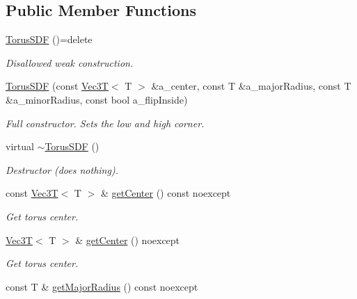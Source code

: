 \subsection*{Public Member Functions}
\begin{DoxyCompactItemize}
\item 
\mbox{\label{classTorusSDF_a4591d7c3cdbbed45fdbaf414f0d096ee}} 
\hyperlink{classTorusSDF_a4591d7c3cdbbed45fdbaf414f0d096ee}{Torus\+S\+DF} ()=delete
\begin{DoxyCompactList}\small\item\em Disallowed weak construction. \end{DoxyCompactList}\item 
\hyperlink{classTorusSDF_acf22c1b59605e93750a3a002fd5bc23a}{Torus\+S\+DF} (const \hyperlink{classVec3T}{Vec3T}$<$ T $>$ \&a\+\_\+center, const T \&a\+\_\+major\+Radius, const T \&a\+\_\+minor\+Radius, const bool a\+\_\+flip\+Inside)
\begin{DoxyCompactList}\small\item\em Full constructor. Sets the low and high corner. \end{DoxyCompactList}\item 
\mbox{\label{classTorusSDF_a97178b72cbb9208b7dde0a6db1ab6e18}} 
virtual \hyperlink{classTorusSDF_a97178b72cbb9208b7dde0a6db1ab6e18}{$\sim$\+Torus\+S\+DF} ()
\begin{DoxyCompactList}\small\item\em Destructor (does nothing). \end{DoxyCompactList}\item 
const \hyperlink{classVec3T}{Vec3T}$<$ T $>$ \& \hyperlink{classTorusSDF_a0973ae5f9e4a023ae15728d0a5063b4d}{get\+Center} () const noexcept
\begin{DoxyCompactList}\small\item\em Get torus center. \end{DoxyCompactList}\item 
\hyperlink{classVec3T}{Vec3T}$<$ T $>$ \& \hyperlink{classTorusSDF_ad4a6d109ff640e2cb003901bf6ac1c85}{get\+Center} () noexcept
\begin{DoxyCompactList}\small\item\em Get torus center. \end{DoxyCompactList}\item 
const T \& \hyperlink{classTorusSDF_acf871d02fb580a9c33d6c54517730036}{get\+Major\+Radius} () const noexcept

\end{DoxyCompactItemize}
